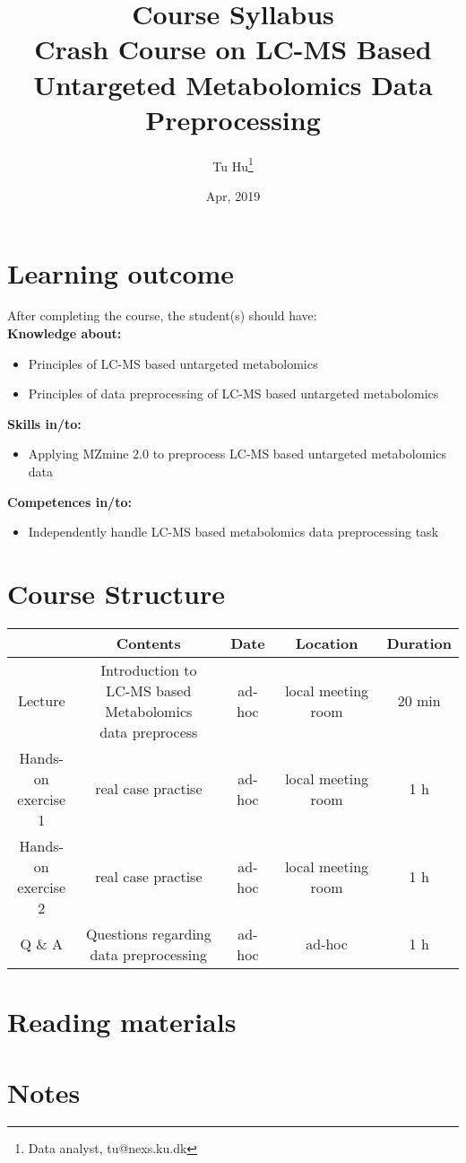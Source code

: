 \documentclass[]{article}
\title{Course Syllabus \\ {\small Crash Course on LC-MS Based Untargeted Metabolomics Data Preprocessing}}
\author{Tu Hu\footnote{Data analyst, tu@nexs.ku.dk}}
\date{Apr, 2019}
\begin{document}
\maketitle


\section{Learning outcome}

After completing the course, the student(s) should have:
\\

\textbf{Knowledge about:}
\begin{itemize}
	\item Principles of LC-MS based untargeted metabolomics
	\item Principles of data preprocessing of LC-MS based untargeted metabolomics\\
\end{itemize}


\textbf{Skills in/to:}
\begin{itemize}
	\item Applying MZmine 2.0 to preprocess LC-MS based untargeted metabolomics data 

\end{itemize}


\textbf{Competences in/to:}
\begin{itemize}
	\item Independently handle LC-MS based metabolomics data preprocessing task
\end{itemize}

\section{Course Structure}
\begin{tabular}{|c|c|c|c|c|}
	\hline 
	& Contents & Date & Location & Duration \\ 
	\hline 
	Lecture & \makecell{Introduction to \\LC-MS based Metabolomics\\ data preprocess} & ad-hoc & local meeting room & 20 min \\ 
	\hline 
	\makecell{Hands-on\\exercise 1} & real case practise & ad-hoc & local meeting room & 1 h \\ 
	\hline 
	\makecell{Hands-on\\exercise 2}  & real case practise & ad-hoc & local meeting room & 1 h \\ 
	\hline 
	Q \& A & \makecell{Questions regarding \\data preprocessing} & ad-hoc & ad-hoc & 1 h \\ 
	\hline 
\end{tabular} 

\section{Reading materials}

\section{Notes}
\end{document}
